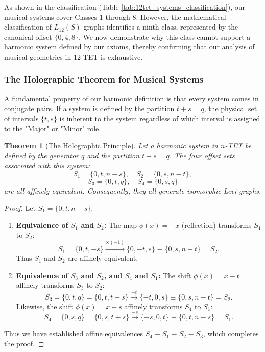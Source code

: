 \documentclass[12pt,letterpaper]{amsart}
\newtheorem{theorem}{Theorem}
\begin{document}
As shown in the classification (Table \ref{tab:12tet_systems_classification}), our musical systems cover Classes 1 through 8. However, the mathematical classification of $L_{12}(S)$ graphs identifies a ninth class, represented by the canonical offset $\{0, 4, 8\}$. We now demonstrate why this class cannot support a harmonic system defined by our axioms, thereby confirming that our analysis of musical geometries in 12-TET is exhaustive.

\subsubsection{The Holographic Theorem for Musical Systems}

A fundamental property of our harmonic definition is that every system comes in conjugate pairs. If a system is defined by the partition $t+s=q$, the physical set of intervals $\{t, s\}$ is inherent to the system regardless of which interval is assigned to the "Major" or "Minor" role.

\begin{theorem}[The Holographic Principle]
Let a harmonic system in $n$-TET be defined by the generator $q$ and the partition $t+s=q$. The four offset sets associated with this system:
\[ S_1 = \{0, t, n-s\}, \quad S_2 = \{0, s, n-t\}, \]
\[ S_3 = \{0, t, q\}, \quad S_4 = \{0, s, q\} \]
are all affinely equivalent. Consequently, they all generate isomorphic Levi graphs.
\end{theorem}

\begin{proof}
Let $S_1 = \{0, t, n-s\}$.
\begin{enumerate}
    \item \textbf{Equivalence of $S_1$ and $S_2$:} The map $\phi(x) = -x$ (reflection) transforms $S_1$ to $S_2$:
      \[S_1= \{0, t, -s\} \xrightarrow{\times( -1)} \{0, -t, s\} \equiv \{0, s,n-t\} = S_2. \]
      Thus $S_1$ and $S_2$ are affinely equivalent.
    \item \textbf{Equivalence of $S_3$ and $S_2$, and $S_4$ and $S_1$:} The shift $\phi(x)=x-t$ affinely transforms $S_3$ to $S_2$:
\[S_3= \{0, t, q\}= \{0, t, t+s\} \xrightarrow{ -t} \{-t,0, s\} \equiv \{0, s, n-t\} = S_2. \]
Likewise, the shift $\phi(x)=x-s$ affinely transforms $S_4$ to $S_1$:
\[S_4= \{0, s, q\}= \{0, s, t+s\} \xrightarrow{ -s} \{-s,0, t\} \equiv \{0, t, n-s\} = S_1. \]
\end{enumerate}
Thus we have established affine equivalences $S_4\equiv S_1\equiv S_2\equiv S_3$, which completes the proof.
\end{proof}
\end{document}
